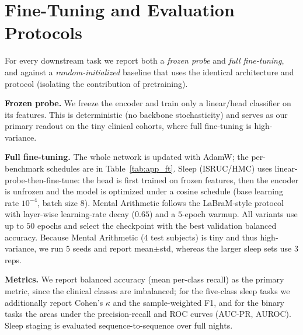 \documentclass[letterpaper]{article}
\begin{document}
\section{Fine-Tuning and Evaluation Protocols}\label{app:ft}
For every downstream task we report both a \emph{frozen probe} and \emph{full
fine-tuning}, and against a \emph{random-initialized} baseline that uses the
identical architecture and protocol (isolating the contribution of pretraining).

\noindent\textbf{Frozen probe.} We freeze the encoder and train only a linear/head
classifier on its features. This is deterministic (no backbone stochasticity) and
serves as our primary readout on the tiny clinical cohorts, where full fine-tuning
is high-variance.

\noindent\textbf{Full fine-tuning.} The whole network is updated with AdamW; the
per-benchmark schedules are in Table~\ref{tab:app_ft}. Sleep (ISRUC/HMC) uses
linear-probe-then-fine-tune: the head is first trained on frozen features, then the
encoder is unfrozen and the model is optimized under a cosine schedule (base
learning rate $10^{-4}$, batch size $8$). Mental Arithmetic follows the LaBraM-style protocol with
layer-wise learning-rate decay ($0.65$) and a $5$-epoch warmup. All variants use up
to $50$ epochs and select the checkpoint with the best validation balanced accuracy.
Because Mental Arithmetic ($4$ test subjects) is
tiny and thus high-variance, we run $5$ seeds and report mean$\pm$std, whereas the
larger sleep sets use $3$ reps.

\noindent\textbf{Metrics.} We report balanced accuracy (mean per-class recall) as
the primary metric, since the clinical classes are imbalanced; for the five-class
sleep tasks we additionally report Cohen's $\kappa$ and the sample-weighted F1, and
for the binary tasks the areas under the precision-recall and ROC curves (AUC-PR,
AUROC). Sleep staging is evaluated sequence-to-sequence over full nights.
\end{document}
